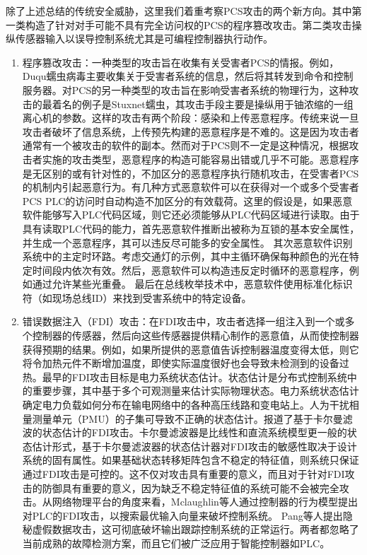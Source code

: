 除了上述总结的传统安全威胁，这里我们着重考察PCS攻击的两个新方向。其中第一类构造了针对对手可能不具有完全访问权的PCS的程序篡改攻击。第二类攻击操纵传感器输入以误导控制系统尤其是可编程控制器执行动作。
\begin{enumerate}
\item 程序篡改攻击：一种类型的攻击旨在收集有关受害者PCS的情报。例如，Duqu蠕虫病毒主要收集关于受害者系统的信息\parencite{Duqu11}，然后将其转发到命令和控制服务器。对PCS的另一种类型的攻击旨在影响受害者系统的物理行为，这种攻击的最着名的例子是Stuxnet蠕虫，其攻击手段主要是操纵用于铀浓缩的一组离心机的参数。这样的攻击有两个阶段：感染和上传恶意程序。传统来说一旦攻击者破坏了信息系统，上传预先构建的恶意程序是不难的。这是因为攻击者通常有一个被攻击的软件的副本。然而对于PCS则不一定是这种情况，根据攻击者实施的攻击类型，恶意程序的构造可能容易出错或几乎不可能。恶意程序是无区别的或有针对性的，不加区分的恶意程序执行随机攻击，在受害者PCS的机制内引起恶意行为。有几种方式恶意软件可以在获得对一个或多个受害者PCS PLC的访问时自动构造不加区分的有效载荷\parencite{McLaughlin112}。这里的假设是，如果恶意软件能够写入PLC代码区域，则它还必须能够从PLC代码区域进行读取。由于具有读取PLC代码的能力，首先恶意软件推断出被称为互锁的基本安全属性\parencite{Chevillat08}，并生成一个恶意程序，其可以违反尽可能多的安全属性。 其次恶意软件识别系统中的主定时环路。考虑交通灯的示例，其中主循环确保每种颜色的光在特定时间段内依次有效。然后，恶意软件可以构造违反定时循环的恶意程序，例如通过允许某些光重叠。 最后在总线枚举技术中，恶意软件使用标准化标识符（如现场总线ID）来找到受害系统中的特定设备\parencite{PROFIBUS10}。
\item 错误数据注入（FDI）攻击：在FDI攻击中，攻击者选择一组注入到一个或多个控制器的传感器，然后向这些传感器提供精心制作的恶意值，从而使控制器获得预期的结果。例如，如果所提供的恶意值告诉控制器温度变得太低，则它将令加热元件不断增加温度，即使实际温度很好也会导致未检测到的设备过热。最早的FDI攻击目标是电力系统状态估计\parencite{Liu10}。状态估计是分布式控制系统中的重要步骤，其中基于多个可观测量来估计实际物理状态。电力系统状态估计确定电力负载如何分布在输电网络中的各种高压线路和变电站上。人为干扰相量测量单元（PMU）的子集可导致不正确的状态估计\parencite{Liu10}。报道了基于卡尔曼滤波的状态估计的FDI攻击。卡尔曼滤波器是比线性和直流系统模型更一般的状态估计形式，基于卡尔曼滤波器的状态估计器对FDI攻击的敏感性取决于设计系统的固有属性\parencite{Liu10}。如果基础状态转移矩阵包含不稳定的特征值，则系统只保证通过FDI攻击是可控的。这不仅对攻击具有重要的意义，而且对于针对FDI攻击的防御具有重要的意义，因为缺乏不稳定特征值的系统可能不会被完全攻击。从网络物理平台的角度来看，Mclaughlin等人\parencite {mclaughlinS2014}通过控制器的行为模型提出对PLC的FDI攻击，以搜索最优输入向量来破坏控制系统。 Pang等人\parencite {pang2015}提出隐秘虚假数据攻击，这可彻底破坏输出跟踪控制系统的正常运行。两者都忽略了当前成熟的故障检测方案\parencite{roth2012,garcia2012,klein2005}，而且它们被广泛应用于智能控制器如PLC。

\end{enumerate}





